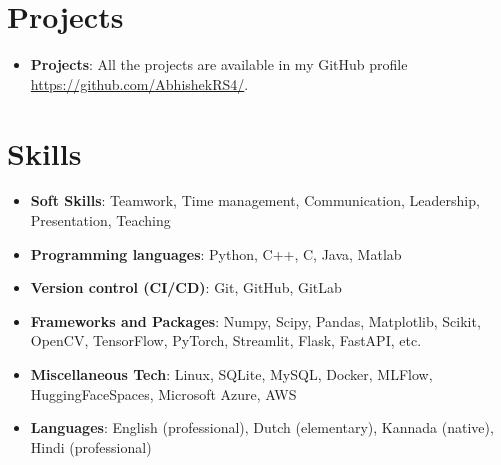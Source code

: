 \documentclass[letterpaper, 10pt]{article}
\newcommand{\resumeItem}[2]{
    \item\small{
        \textbf{#1}{: #2 \vspace{-2pt}}
    }
}
\newcommand{\resumeSubItem}[2]{\resumeItem{#1}{#2}\vspace{-4pt}}
\newcommand{\resumeSubHeadingListStart}{\begin{itemize}[leftmargin=*]}
\newcommand{\resumeSubHeadingListEnd}{\end{itemize}}
\begin{document}

\section{Projects}
    \resumeSubHeadingListStart
        \resumeSubItem{Projects}
        {All the projects are available in my GitHub profile \href{https://github.com/AbhishekRS4/}{https://github.com/AbhishekRS4/}.}
    \resumeSubHeadingListEnd

\section{Skills}
    \resumeSubHeadingListStart
        \resumeSubItem{Soft Skills}
        {Teamwork, Time management, Communication, Leadership, Presentation, Teaching}
        \resumeSubItem{Programming languages}
        {Python, C++, C, Java, Matlab}
        \resumeSubItem{Version control (CI/CD)}
        {Git, GitHub, GitLab}
        \resumeSubItem{Frameworks and Packages}
        {Numpy, Scipy, Pandas, Matplotlib, Scikit, OpenCV, TensorFlow, PyTorch, Streamlit, Flask, FastAPI, etc.}
        \resumeSubItem{Miscellaneous Tech}
        {Linux, SQLite, MySQL, Docker, MLFlow, HuggingFaceSpaces, Microsoft Azure, AWS}
        \resumeSubItem{Languages}
        {English (professional), Dutch (elementary), Kannada (native), Hindi (professional)}
    \resumeSubHeadingListEnd
\end{document}
